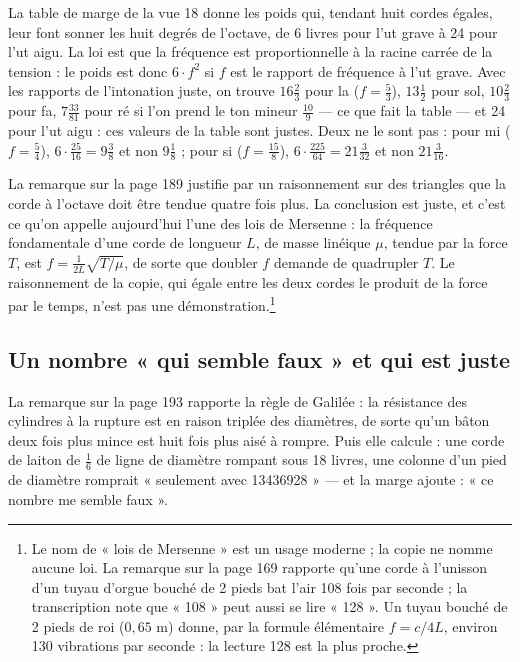 \documentclass[11pt,a4paper]{article}
\begin{document}
La table de marge de la vue 18 donne les poids qui, tendant huit cordes égales,
leur font sonner les huit degrés de l'octave, de 6 livres pour l'ut grave à 24
pour l'ut aigu. La loi est que la fréquence est proportionnelle à la racine
carrée de la tension : le poids est donc $6 \cdot f^2$ si $f$ est le rapport de
fréquence à l'ut grave. Avec les rapports de l'intonation juste, on trouve
$16\frac23$ pour la ($f = \frac53$), $13\frac12$ pour sol, $10\frac23$ pour fa,
$7\frac{33}{81}$ pour ré si l'on prend le ton mineur $\frac{10}{9}$ — ce que
fait la table — et 24 pour l'ut aigu : ces valeurs de la table sont justes.
Deux ne le sont pas : pour mi ($f = \frac54$), $6 \cdot \frac{25}{16} =
9\frac38$ et non $9\frac18$ ; pour si ($f = \frac{15}{8}$), $6\cdot
\frac{225}{64} = 21\frac{3}{32}$ et non $21\frac{3}{16}$.

La remarque sur la page 189 justifie par un raisonnement sur des triangles
que la corde à l'octave doit être tendue quatre fois plus. La conclusion est
juste, et c'est ce qu'on appelle aujourd'hui l'une des lois de Mersenne : la
fréquence fondamentale d'une corde de longueur $L$, de masse linéique $\mu$,
tendue par la force $T$, est $f = \frac{1}{2L}\sqrt{T/\mu}$, de sorte que
doubler $f$ demande de quadrupler $T$. Le raisonnement de la copie, qui égale
entre les deux cordes le produit de la force par le temps, n'est pas une
démonstration.\footnote{Le nom de « lois de Mersenne » est un usage moderne ;
la copie ne nomme aucune loi. La remarque sur la page 169 rapporte qu'une corde
à l'unisson d'un tuyau d'orgue bouché de 2 pieds bat l'air 108 fois par
seconde ; la transcription note que « 108 » peut aussi se lire « 128 ». Un tuyau
bouché de 2 pieds de roi ($0{,}65$ m) donne, par la formule élémentaire
$f = c/4L$, environ 130 vibrations par seconde : la lecture 128 est la plus
proche.}

\subsection*{Un nombre « qui semble faux » et qui est juste}

La remarque sur la page 193 rapporte la règle de Galilée : la résistance des
cylindres à la rupture est en raison triplée des diamètres, de sorte qu'un
bâton deux fois plus mince est huit fois plus aisé à rompre. Puis elle calcule :
une corde de laiton de $\frac16$ de ligne de diamètre rompant sous 18 livres,
une colonne d'un pied de diamètre romprait « seulement avec 13436928 » — et la
marge ajoute : « ce nombre me semble faux ».
\end{document}
